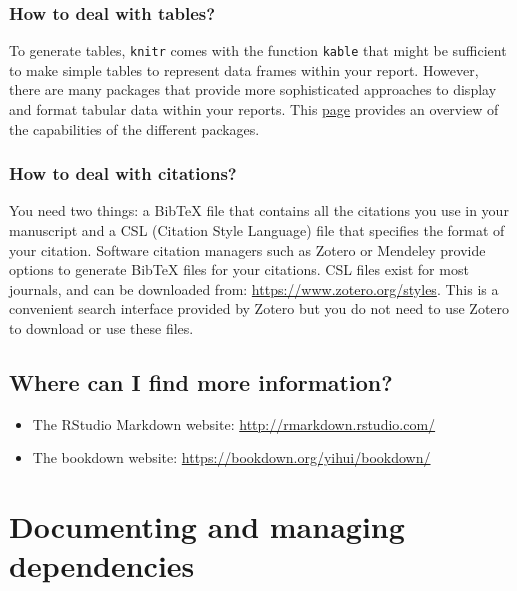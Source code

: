 \documentclass[
]{book}
\providecommand{\tightlist}{%
  \setlength{\itemsep}{0pt}\setlength{\parskip}{0pt}}
\begin{document}
\hypertarget{how-to-deal-with-tables}{%
\subsection{How to deal with tables?}\label{how-to-deal-with-tables}}

To generate tables, \texttt{knitr} comes with the function \texttt{kable} that might be sufficient to make simple tables to represent data frames within your report. However, there are many packages that provide more sophisticated approaches to display and format tabular data within your reports. This \href{https://hughjonesd.github.io/huxtable/design-principles.html}{page} provides an overview of the capabilities of the different packages.

\hypertarget{how-to-deal-with-citations}{%
\subsection{How to deal with citations?}\label{how-to-deal-with-citations}}

You need two things: a BibTeX file that contains all the citations you use in your manuscript and a CSL (Citation Style Language) file that specifies the format of your citation. Software citation managers such as Zotero or Mendeley provide options to generate BibTeX files for your citations. CSL files exist for most journals, and can be downloaded from: \url{https://www.zotero.org/styles}. This is a convenient search interface provided by Zotero but you do not need to use Zotero to download or use these files.

\hypertarget{where-can-i-find-more-information}{%
\section{Where can I find more information?}\label{where-can-i-find-more-information}}

\begin{itemize}
\tightlist
\item
  The RStudio Markdown website: \url{http://rmarkdown.rstudio.com/}
\item
  The bookdown website: \url{https://bookdown.org/yihui/bookdown/}
\end{itemize}

\hypertarget{documenting-and-managing-dependencies}{%
\chapter{Documenting and managing dependencies}\label{documenting-and-managing-dependencies}}
\end{document}
